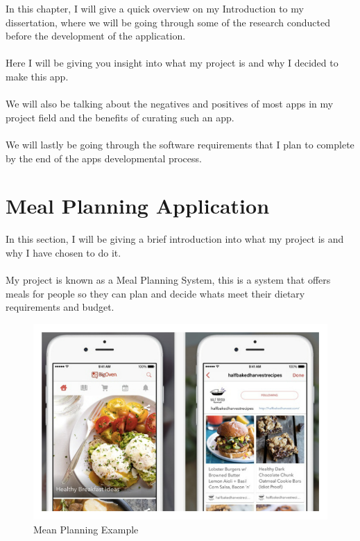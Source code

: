 In this chapter, I will give a quick overview on my Introduction to my dissertation, where we will be going through some of the research conducted before the development of the application.\\ \\
Here I will be giving you insight into what my project is and why I decided to make this app.\\ \\
We will also be talking about the negatives and positives of most apps in my project field and the benefits of curating such an app.\\ \\
We will lastly be going through the software requirements that I plan to complete by the end of the apps developmental process.

\section {Meal Planning Application}

In this section, I will be giving a brief introduction into what my project is and why I have chosen to do it.\\ \\
My project is known as a Meal Planning System, this is a system that offers meals for people so they can plan and decide whats meet their dietary requirements and budget.

\begin{center}
  \begin{figure}[H]
    \includegraphics[width=\textwidth]{img/mealplanningpic.jpg}
    \caption{Mean Planning Example}
    \label{fig: Example of a Meal Planning System}
  \end{figure}
\end{center}

